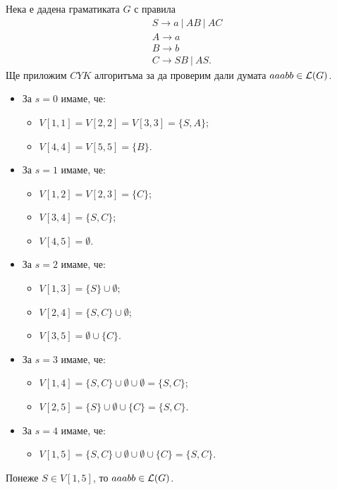 \begin{example}
  Нека е дадена граматиката $G$ с правила 
  \begin{align*}
    & S\rightarrow a\ |\ AB\ |\ AC\\
    & A\rightarrow a\\
    & B\rightarrow b\\
    & C\rightarrow SB\ |\ AS.
  \end{align*}
  Ще приложим $CYK$ алгоритъма за да проверим дали думата $aaabb \in \mathcal{L}(G)$.
  \begin{itemize}
  \item 
    За $s = 0$ имаме, че:
    \begin{itemize}
    \item 
      $V[1,1] = V[2,2] = V[3,3] = \{S,A\}$;
    \item
      $V[4,4] = V[5,5] = \{B\}$.
    \end{itemize}
  \item
    За $s = 1$ имаме, че:
    \begin{itemize}
    \item
      $V[1,2] = V[2,3] = \{C\}$;
    \item
      $V[3,4] = \{S,C\}$;
    \item
      $V[4,5] = \emptyset$.
    \end{itemize}
  \item
    За $s = 2$ имаме, че:
    \begin{itemize}
    \item
      $V[1,3] = \{S\} \cup \emptyset$;
    \item
      $V[2,4] = \{S,C\} \cup \emptyset$;
    \item
      $V[3,5] = \emptyset \cup \{C\}$.
    \end{itemize}
  \item
    За $s = 3$ имаме, че:
    \begin{itemize}
    \item
      $V[1,4] = \{S,C\} \cup \emptyset \cup \emptyset = \{S,C\}$;
    \item
      $V[2,5] = \{S\} \cup \emptyset \cup \{C\} = \{S,C\}$.
    \end{itemize}
  \item
    За $s = 4$ имаме, че:
    \begin{itemize}
    \item 
      $V[1,5] = \{S,C\} \cup \emptyset \cup \emptyset \cup \{C\}= \{S,C\}$.
    \end{itemize}
  \end{itemize}
  Понеже $S \in V[1,5]$, то $aaabb \in \mathcal{L}(G)$.
\end{example}


